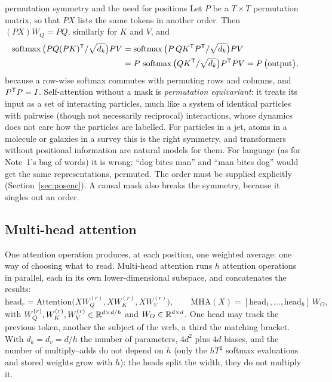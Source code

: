 \documentclass[11pt]{article}
\newcommand{\softmax}{\operatorname{softmax}}
\begin{document}
\begin{physics}{permutation symmetry and the need for positions}
Let $P$ be a $T \times T$ permutation matrix, so that $PX$ lists the same tokens in another order. Then $(PX)W_Q = PQ$,
similarly for $K$ and $V$, and
\[
\begin{aligned}
  \softmax\big(PQ(PK)\T/\sqrt{d_k}\big)PV &= \softmax\big(P\,QK\T P\T/\sqrt{d_k}\big)PV \\
  &= P\,\softmax\big(QK\T/\sqrt{d_k}\big)P\T P V = P\,\big(\text{output}\big),
\end{aligned}
\]
because a row-wise softmax commutes with permuting rows and columns, and $P^{\mathsf{T}} P = I$. Self-attention without a mask is
\emph{permutation equivariant}: it treats its input as a set of interacting particles, much like a system of identical
particles with pairwise (though not necessarily reciprocal) interactions, whose dynamics does not care how the particles
are labelled. For particles in a
jet, atoms in a molecule or galaxies in a survey this is the right symmetry, and transformers without positional
information are natural models for them. For language (as for Note~1's bag of words) it is wrong: ``dog bites man'' and ``man bites dog'' would get the
same representations, permuted. The order must be supplied explicitly (Section~\ref{sec:posenc}). A causal mask also breaks
the symmetry, because it singles out an order.
\end{physics}

\subsection{Multi-head attention}\label{sec:mha}

One attention operation produces, at each position, one weighted average: one way of choosing what to read. Multi-head
attention runs $h$ attention operations in parallel, each in its own lower-dimensional subspace, and concatenates the
results:
\begin{equation}\label{eq:mha}
  \mathrm{head}_r = \mathrm{Attention}\big(XW_Q^{(r)}, XW_K^{(r)}, XW_V^{(r)}\big), \qquad
  \mathrm{MHA}(X) = [\mathrm{head}_1, \dots, \mathrm{head}_h]\,W_O ,
\end{equation}
with $W_Q^{(r)}, W_K^{(r)}, W_V^{(r)} \in \mathbb{R}^{d \times d/h}$ and $W_O \in \mathbb{R}^{d \times d}$. One head may track the previous
token, another the subject of the verb, a third the matching bracket. With $d_k = d_v = d/h$ the number of parameters,
$4d^2$ plus $4d$ biases, and the number of multiply--adds do not depend on $h$ (only the $hT^2$ softmax evaluations and
stored weights grow with $h$): the heads split the width, they do not multiply it.
\end{document}

